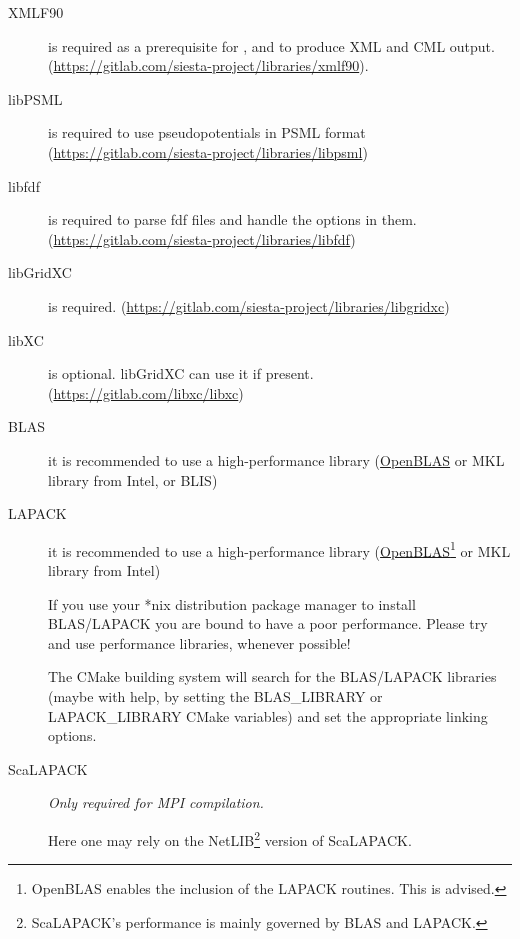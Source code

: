 \begin{description}

  \item[XMLF90] %
  is required as a prerequisite for , and to produce XML and CML output.
  (\url{https://gitlab.com/siesta-project/libraries/xmlf90}).

  \item[libPSML] %
  is required to use pseudopotentials in PSML format
  (\url{https://gitlab.com/siesta-project/libraries/libpsml})

  \item[libfdf] %
  is required to parse fdf files and handle the options in them.
  (\url{https://gitlab.com/siesta-project/libraries/libfdf})

  \item[libGridXC] %
  is required.
  (\url{https://gitlab.com/siesta-project/libraries/libgridxc})

  \item[libXC] %
  is optional. libGridXC can use it if present.
  (\url{https://gitlab.com/libxc/libxc})

  \item[BLAS] %
  it is recommended to use a high-performance library
  (\href{https://github.com/xianyi/OpenBLAS}{OpenBLAS} or MKL
  library from Intel, or BLIS)


  \item[LAPACK]%
  it is recommended to use a high-performance library
  (\href{https://github.com/xianyi/OpenBLAS}{OpenBLAS}\footnote{OpenBLAS
      enables the inclusion of the LAPACK routines. This is advised.}
  or MKL library from Intel)

    \note If you use your *nix distribution package manager to install
    BLAS/LAPACK you are bound to have a poor performance. Please try and use
    performance libraries, whenever possible!

  The CMake building system will search for the BLAS/LAPACK libraries
  (maybe with help, by setting the BLAS\_LIBRARY or LAPACK\_LIBRARY CMake
  variables) and set the appropriate linking options.

  \item[ScaLAPACK]%
  \emph{Only required for MPI compilation.}

  Here one may rely on the NetLIB\footnote{ScaLAPACK's
      performance is mainly governed by BLAS and LAPACK.} version of
  ScaLAPACK.

\end{description}

